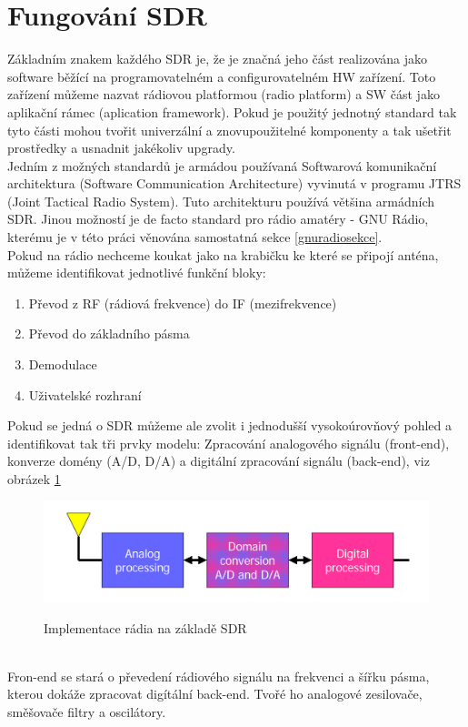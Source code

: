 \documentclass{ctuthesis}
\begin{document}
\section{Fungování SDR}
Základním znakem každého SDR je, že je značná jeho část realizována jako software běžící na programovatelném a configurovatelném HW zařízení. Toto zařízení můžeme nazvat rádiovou platformou (radio platform) a SW část jako aplikační rámec (aplication framework). Pokud je použitý jednotný standard tak tyto části mohou tvořit univerzální a znovupoužitelné komponenty a tak ušetřit prostředky a usnadnit jakékoliv upgrady.\\
Jedním z možných standardů je armádou používaná Softwarová komunikační architektura (Software Communication Architecture) vyvinutá  v programu JTRS (Joint Tactical Radio System). Tuto architekturu používá většina armádních SDR. \cite{sdr2006}
Jinou možností je de facto standard pro rádio amatéry - GNU Rádio, kterému je v této práci věnována samostatná sekce \ref{gnuradiosekce}.\\
Pokud na rádio nechceme koukat jako na krabičku ke které se připojí anténa, můžeme identifikovat jednotlivé funkční bloky:
\begin{enumerate}
\item
Převod z RF (rádiová frekvence) do IF (mezifrekvence)
\item
Převod do základního pásma
\item
Demodulace
\item
Uživatelské rozhraní
\end{enumerate}
Pokud se jedná o SDR můžeme ale zvolit i jednodušší vysokoúrovňový pohled a identifikovat tak tři prvky modelu: Zpracování analogového signálu (front-end), konverze domény (A/D, D/A) a digitální zpracování signálu (back-end), viz obrázek \ref{blokySDR}
\begin{figure}
\caption{Implementace rádia na základě SDR\cite{sdr2006}}
\includegraphics[width=1\textwidth]{./images/funkcniSDRbloky.png}
\label{blokySDR}
\end{figure}
\\
Fron-end se stará o převedení rádiového signálu na frekvenci a šířku pásma, kterou dokáže zpracovat digítální back-end. Tvořé ho analogové zesilovače, směšovače filtry a oscilátory.\\
\end{document}
